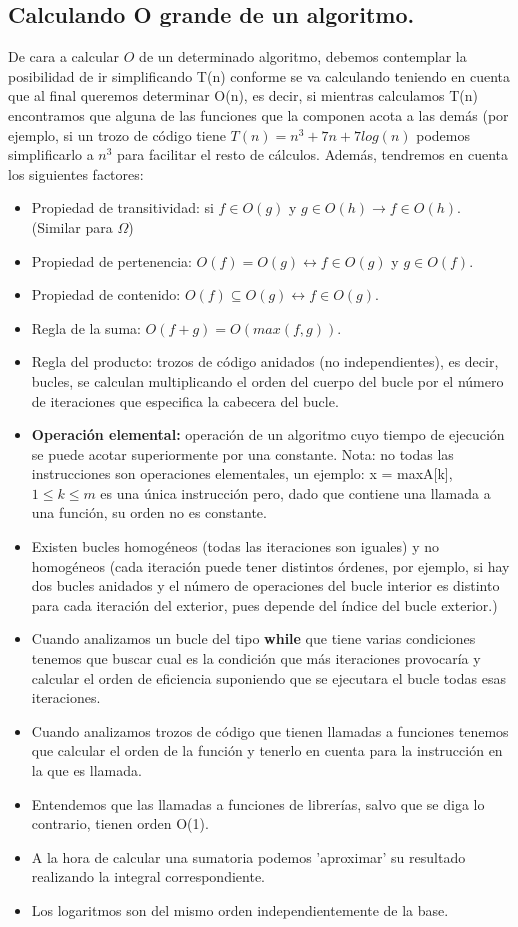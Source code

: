 \documentclass[a4paper, 11pt]{article}
\begin{document}
\subsection{Calculando O grande de un algoritmo.}

De cara a calcular $O$ de un determinado algoritmo, debemos contemplar la posibilidad de ir simplificando T(n) conforme se va calculando teniendo en cuenta que al final queremos determinar O(n), es decir, si mientras calculamos T(n) encontramos que alguna de las funciones que la componen acota a las demás (por ejemplo, si un trozo de código tiene $T(n) = n^3+7n+7log(n)$ podemos simplificarlo a $n^3$ para facilitar el resto de cálculos. Además, tendremos en cuenta los siguientes factores:
\begin{itemize}
\item Propiedad de transitividad: 	si $f\in O(g) $ y $ g \in O(h) \rightarrow f \in O(h)$. (Similar para $\Omega$)
\item Propiedad de pertenencia: $O(f) = O(g) \leftrightarrow f \in O(g) $ y $g \in O(f)$. 
\item Propiedad de contenido:  $O(f) \subseteq O(g) \leftrightarrow f \in O(g)$.  
\item Regla de la suma: $O(f+g) = O(max(f,g))$. 
\item Regla del producto: trozos de código anidados (no independientes), es decir, bucles, se calculan multiplicando el orden del cuerpo del bucle por el número de iteraciones que especifica la cabecera del bucle. 
\item \textbf{Operación elemental: } operación de un algoritmo cuyo tiempo de ejecución se puede acotar superiormente por una constante.
Nota: no todas las instrucciones son operaciones elementales, un ejemplo: x = max{A[k], $1 \leq k \leq m$} es una única instrucción pero, dado que contiene una llamada a una función, su orden no es constante. 
\item Existen bucles homogéneos (todas las iteraciones son iguales) y no homogéneos  (cada iteración puede tener distintos órdenes, por ejemplo, si hay dos bucles anidados y el número de operaciones del bucle interior es distinto para cada iteración del exterior, pues depende del índice del bucle exterior.)
\item Cuando analizamos un bucle del tipo \textbf{while} que tiene varias condiciones tenemos que buscar cual es la condición que más iteraciones provocaría y calcular el orden de eficiencia suponiendo que se ejecutara el bucle todas esas iteraciones. 
\item Cuando analizamos trozos de código que tienen llamadas a funciones tenemos que calcular el orden de la función y tenerlo en cuenta para la instrucción en la que es llamada.
\item Entendemos que las llamadas a funciones de librerías, salvo que se diga lo contrario, tienen orden O(1). 
\item A la hora de calcular una sumatoria podemos 'aproximar' su resultado realizando la integral correspondiente. 
\item Los logaritmos son del mismo orden independientemente de la base. 

\end{itemize}
\end{document}
